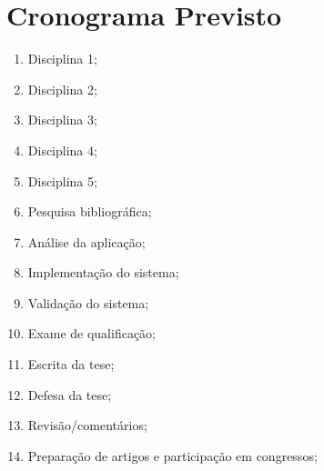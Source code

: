 \documentclass[
	12pt,				%
	oneside,			%
	a4paper,			%
	english,			%
	french,				%
	spanish,			%
	brazil,				%
	]{abntex2}
\begin{document}
\chapter*[Cronograma Previsto]{Cronograma Previsto}
\begin{enumerate}
	\item Disciplina 1; %
	\item Disciplina 2; %
	\item Disciplina 3; %
	\item Disciplina 4; %
	\item Disciplina 5; %
	\item Pesquisa bibliográfica; %
	\item Análise da aplicação; %
	\item Implementação do sistema; %
	\item Validação do sistema; %
	\item Exame de qualificação; %
	\item Escrita da tese; %
	\item Defesa da tese; %
	\item Revisão/comentários; %
	\item Preparação de artigos e participação em congressos; %
\end{enumerate}
\end{document}
